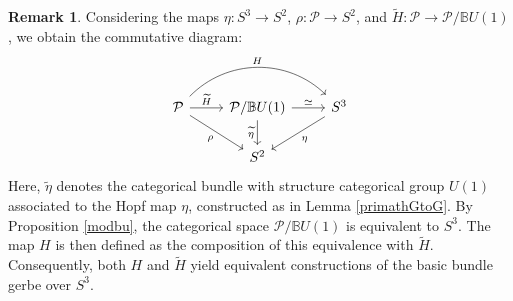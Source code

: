 \documentclass{article}
\theoremstyle{plain}
\theoremstyle{definition}
\newtheorem{rem}[thm]{Remark}
\begin{document}
\begin{rem}\label{factorizationdiagram}
Considering the maps $\eta:S^3 \longrightarrow S^2$, $\rho:\mathcal{P} \longrightarrow S^2$, and $\widetilde{H}:\mathcal{P} \longrightarrow \mathcal{P}/\mathbb{B}U(1)$, we obtain the commutative diagram:
\begin{equation}\label{factordiag}
\begin{tikzcd}
\mathcal{P} \arrow[rr,bend left=45,"H"] \arrow[r,"\widetilde{H}"] \arrow[dr,"\rho"'] & \mathcal{P}/\mathbb{B}U(1) \arrow[d,"\widetilde{\eta}"'] \arrow[r,"\simeq"] & S^3 \arrow[dl,"\eta"] \\
& S^2 &
\end{tikzcd}
\end{equation}
Here, $\widetilde{\eta}$ denotes the categorical bundle with structure categorical group $U(1)$ associated to the Hopf map $\eta$, constructed as in Lemma \ref{primathGtoG}. By Proposition \ref{modbu}, the categorical space $\mathcal{P}/\mathbb{B}U(1)$ is equivalent to $S^3$. The map $H$ is then defined as the composition of this equivalence with $\widetilde{H}$. Consequently, both $H$ and $\widetilde{H}$ yield equivalent constructions of the basic bundle gerbe over $S^3$.
\end{rem}
\end{document}
